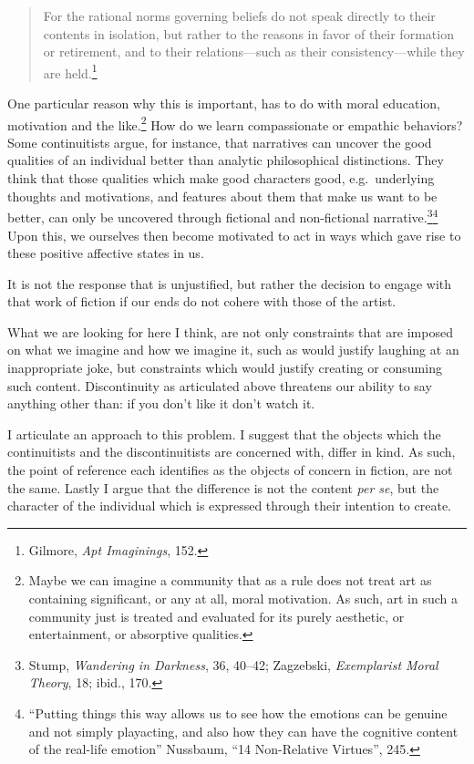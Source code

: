 \documentclass[
  12pt,
]{book}
\theoremstyle{definition}
\theoremstyle{definition}
\theoremstyle{definition}
\theoremstyle{definition}
\theoremstyle{remark}
\begin{document}
\begin{quote}
For the rational norms governing beliefs do not speak directly to their contents in isolation, but rather to the reasons in favor of their formation or retirement, and to their relations---such as their consistency---while they are held.\footnote{Gilmore, \emph{Apt {Imaginings}}, 152.}
\end{quote}

One particular reason why this is important, has to do with moral education, motivation and the like.\footnote{Maybe we can imagine a community that as a rule does not treat art as containing significant, or any at all, moral motivation. As such, art in such a community just is treated and evaluated for its purely aesthetic, or entertainment, or absorptive qualities.} How do we learn compassionate or empathic behaviors? Some continuitists argue, for instance, that narratives can uncover the good qualities of an individual better than analytic philosophical distinctions. They think that those qualities which make good characters good, e.g.~underlying thoughts and motivations, and features about them that make us want to be better, can only be uncovered through fictional and non-fictional narrative.\footnote{Stump, \emph{Wandering in {Darkness}}, 36, 40--42; Zagzebski, \emph{Exemplarist {Moral Theory}}, 18; ibid., 170.}\footnote{``Putting things this way allows us to see how the emotions can be genuine and not simply playacting, and also how they can have the cognitive content of the real-life emotion'' Nussbaum, {``14 {Non-Relative Virtues}''}, 245.} Upon this, we ourselves then become motivated to act in ways which gave rise to these positive affective states in us.

It is not the response that is unjustified, but rather the decision to engage with that work of fiction if our ends do not cohere with those of the artist.

What we are looking for here I think, are not only constraints that are imposed on what we imagine and how we imagine it, such as would justify laughing at an inappropriate joke, but constraints which would justify creating or consuming such content. Discontinuity as articulated above threatens our ability to say anything other than: if you don't like it don't watch it.

I articulate an approach to this problem. I suggest that the objects which the continuitists and the discontinuitists are concerned with, differ in kind. As such, the point of reference each identifies as the objects of concern in fiction, are not the same. Lastly I argue that the difference is not the content \emph{per se}, but the character of the individual which is expressed through their intention to create.
\end{document}
